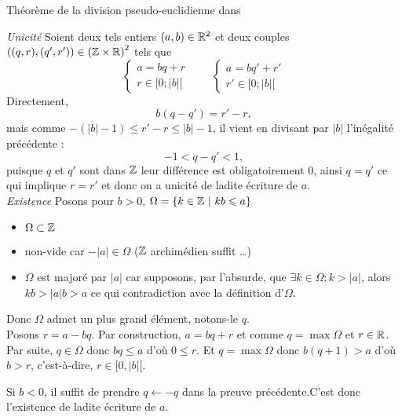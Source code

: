 \documentclass{article}
\begin{document}
	\begin{question_kholle}
		[\begin{equation}
			\forall (a, b) \in \R \times \R^*,
			\exists ! (q, r) \in \Z \times \R :
			\left\{ \begin{matrix}
				a = b q + r \\
				r \in [0;|b|[
			\end{matrix} \right.
		\end{equation}]
		{Théorème de la division pseudo-euclidienne dans \R}

		\textit{Unicité} \;
		Soient deux tels entiers $(a,b) \in \mathbb R^2$ et deux couples $((q,r),(q',r')) \in \left(\mathbb Z \times \mathbb R\right)^2$ tels que
		\begin{equation*}
			\left\{ \begin{matrix}
				a = b q + r \\
				r \in [0;|b|[
			\end{matrix} \right.
			\qquad
			\left\{ \begin{matrix}
				a = b q' + r' \\
				r' \in [0;|b|[
			\end{matrix} \right.
		\end{equation*}
		Directement,
		\[
		b(q-q') = r'-r,
		\]
		mais comme $-(|b|-1) \leq r' - r \leq |b| -1$, il vient en divisant par $|b|$ l'inégalité précédente :
		\[
		-1 < q - q' < 1,
		\]
		puisque $q$ et $q'$ sont dans $\mathbb Z$ leur différence est obligatoirement $0$, ainsi $q = q'$ ce qui implique $ r= r'$ et donc on a unicité de ladite écriture de $a$.
		\newline
		\\
		\textit{Existence} \; Posons pour $b > 0$, $\Omega = \{ k\in \mathbb Z  \ | \ kb \leqslant a \}$
		\begin{itemize}
			\item $\Omega \subset \mathbb Z$
			\item non-vide car $-|a| \in \Omega$ ($\mathbb Z$ archimédien suffit \ldots)
			\item $\Omega$ est majoré par $|a|$ car supposons, par l'absurde, que $\exists k \in \Omega : k > |a|$, alors $kb > |a|b > a$ ce qui contradiction avec la définition d'$\Omega$.
		\end{itemize}
		Donc $\Omega$ admet un plus grand élément, notons-le $q$. \\
		Posons $r = a - bq$. Par construction, $a = bq + r$ et comme $q = \max \Omega$ et $r \in \mathbb R$.
		\\
		Par suite, $q \in \Omega$ donc $bq \leqslant a$ d'où $0 \leqslant r$. Et $q = \max \Omega$ donc $b(q+1) > a$ d'où $b > r$, c'est-à-dire, $r \in [ 0, |b| [$.

		Si $b < 0$, il suffit de prendre $q \leftarrow -q$ dans la preuve précédente.C'est donc l'existence de ladite écriture de $a$.
	\end{question_kholle}
\end{document}
